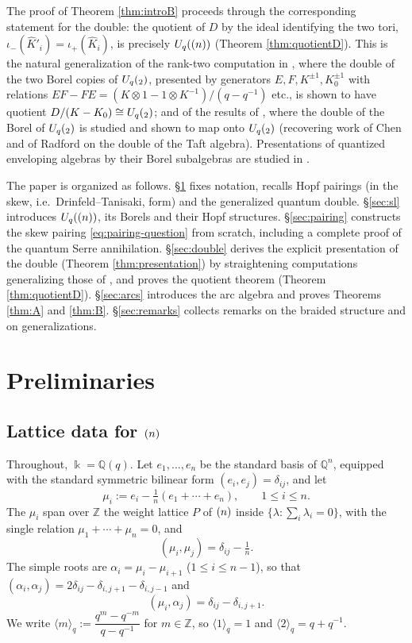 \documentclass[11pt]{amsart}
\theoremstyle{definition}
\newcommand{\BK}{\Bbbk}
\newcommand{\iop}{\iota_{+}}
\newcommand{\iom}{\iota_{-}}
\newcommand{\hK}{\hat K}
\newcommand{\al}{\alpha}
\begin{document}
The proof of Theorem \ref{thm:introB} proceeds through the corresponding statement
for the double: the quotient of $D$ by the ideal identifying the two tori,
$\iom(\hK'_i)=\iop(\hK_i)$, is precisely $U_q(\sl(n))$ (Theorem \ref{thm:quotientD}).
This is the natural generalization of the rank-two computation in
\cite[Cor.~2.12]{UvA}, where the double of the two Borel copies of
$U_q(\sl_2)$, presented by generators $E,F,K^{\pm1},K_0^{\pm1}$ with relations
$EF-FE=(K\otimes 1-1\otimes K^{-1})/(q-q^{-1})$ etc., is shown to have quotient
$D/(K-K_0)\cong U_q(\sl_2)$; and of the results of \cite{Z}, where the double of
the Borel of $U_q(\sl_2)$ is studied and shown to map onto $U_q(\sl_2)$ (recovering
work of Chen and of Radford on the double of the Taft algebra). Presentations of
quantized enveloping algebras by their Borel subalgebras are studied in
\cite{Cam}.

The paper is organized as follows. \S\ref{sec:prelim} fixes notation, recalls
Hopf pairings (in the skew, i.e.\ Drinfeld--Tanisaki, form) and the generalized
quantum double. \S\ref{sec:sl} introduces $U_q(\sl(n))$, its Borels and their
Hopf structures. \S\ref{sec:pairing} constructs the skew pairing
\eqref{eq:pairing-question} from scratch, including a complete proof of the
quantum Serre annihilation. \S\ref{sec:double} derives the explicit presentation
of the double (Theorem \ref{thm:presentation}) by straightening computations
generalizing those of \cite{UvA}, and proves the quotient theorem
(Theorem \ref{thm:quotientD}). \S\ref{sec:arcs} introduces the arc algebra and
proves Theorems \ref{thm:A} and \ref{thm:B}. \S\ref{sec:remarks} collects
remarks on the braided structure and on generalizations.

\section{Preliminaries}\label{sec:prelim}

\subsection{Lattice data for $\sl(n)$}\label{sec:lattices}
Throughout, $\BK=\mathbb{Q}(q)$. Let $e_1,\dots,e_n$ be the standard basis of
$\mathbb{Q}^n$, equipped with the standard symmetric bilinear form
$(e_i,e_j)=\delta_{ij}$, and let
\[
\mu_i:=e_i-\tfrac1n(e_1+\cdots+e_n),\qquad 1\le i\le n .
\]
The $\mu_i$ span over $\mathbb{Z}$ the weight lattice $P$ of $\sl(n)$ inside
$\{\lambda:\sum_i\lambda_i=0\}$, with the single relation
$\mu_1+\cdots+\mu_n=0$, and
\[
(\mu_i,\mu_j)=\delta_{ij}-\tfrac1n .
\]
The simple roots are $\al_i=\mu_i-\mu_{i+1}$ ($1\le i\le n-1$), so that
$(\al_i,\al_j)=2\delta_{ij}-\delta_{i,j+1}-\delta_{i,j-1}$ and
\[
(\mu_i,\al_j)=\delta_{ij}-\delta_{i,j+1}.
\]
We write $\langle m\rangle_q:=\dfrac{q^m-q^{-m}}{q-q^{-1}}$ for $m\in\mathbb{Z}$,
so $\langle 1\rangle_q=1$ and $\langle 2\rangle_q=q+q^{-1}$.
\end{document}
